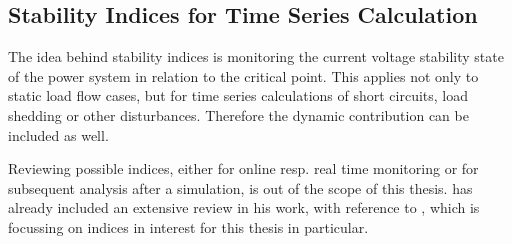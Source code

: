 \subsection{Stability Indices for Time Series Calculation}
\label{sec:stability-indices}

The idea behind stability indices is monitoring the current voltage stability state of the power system in relation to the critical point.
This applies not only to static load flow cases, but for time series calculations of short circuits, load shedding or other disturbances.
Therefore the dynamic contribution can be included as well. \quelle

Reviewing possible indices, either for online resp. real time monitoring or for subsequent analysis after a simulation, is out of the scope of this thesis.
\textcite{danish_2015} has already included an extensive review in his work, with reference to \textcite{doigcardet_2010}, which is focussing on indices in interest for this thesis in particular. 

